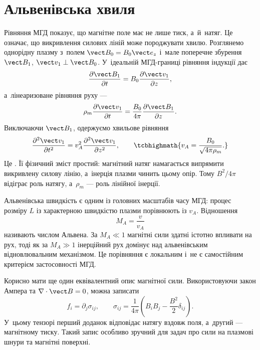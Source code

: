 \section{Альвенівська хвиля}



Рівняння МГД показує, що магнітне поле має не лише тиск, а~й~натяг. Це означає, що
викривлення силових ліній може породжувати хвилю. Розглянемо однорідну плазму з~полем
$\vect B_0=B_0\vect e_z$ і~мале поперечне збурення $\vect B_1$, $\vect v_1\perp\vect B_0$.
У~ідеальній МГД-границі рівняння індукції дає
\begin{equation*}
    \frac{\partial\vect B_1}{\partial t}
    =B_0\frac{\partial\vect v_1}{\partial z},
\end{equation*}
а~лінеаризоване рівняння руху —
\begin{equation*}
    \rho_m\frac{\partial\vect v_1}{\partial t}
    =\frac{B_0}{4\pi}\frac{\partial\vect B_1}{\partial z}.
\end{equation*}
Виключаючи $\vect B_1$, одержуємо хвильове рівняння
\begin{equation}\label{eq:alfven-wave}
    \frac{\partial^2\vect v_1}{\partial t^2}
    =v_A^2\frac{\partial^2\vect v_1}{\partial z^2},
    \qquad
    \tcbhighmath{
    v_A=\frac{B_0}{\sqrt{4\pi\rho_m}}.
    }
\end{equation}
Це . Її фізичний зміст простий: магнітний натяг намагається
випрямити викривлену силову лінію, а~інерція плазми чинить цьому опір. Тому $B^2/4\pi$
відіграє роль натягу, а~$\rho_m$ --- роль лінійної інерції.

Альвенівська швидкість є одним із головних масштабів часу МГД: процес розміру $L$ із
характерною швидкістю плазми порівнюють із $v_A$. Відношення
\begin{equation*}
M_A=\frac{v}{v_A}
\end{equation*}
називають числом Альвена. За $M_A\ll1$ магнітні сили здатні істотно впливати на рух, тоді
як за $M_A\gg1$ інерційний рух домінує над альвенівським відновлювальним механізмом. Це
порівняння є локальним і~не є самостійним критерієм застосовності МГД.

Корисно мати ще один еквівалентний опис магнітної сили. Використовуючи закон Ампера та
$\nabla\cdot\vect B=0$, можна записати
\begin{equation}\label{eq:new-maxwell-stress}
    f_i=\partial_j\sigma_{ij},
    \qquad
    \sigma_{ij}=
    \frac{1}{4\pi}
    \left(B_iB_j-\frac{B^2}{2}\delta_{ij}\right).
\end{equation}
У~цьому тензорі перший доданок відповідає натягу вздовж поля, а~другий --- магнітному
тиску. Такий запис особливо зручний для задач про сили на плазмові шнури та магнітні
поверхні.



